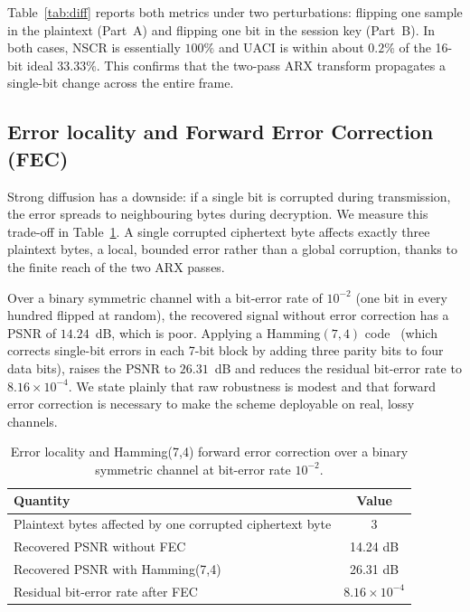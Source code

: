 \documentclass[pdflatex,sn-mathphys-num]{sn-jnl}%
\theoremstyle{thmstyleone}%
\theoremstyle{thmstyletwo}%
\theoremstyle{thmstylethree}%
\begin{document}
Table~\ref{tab:diff} reports both metrics under two perturbations: flipping one sample in the plaintext (Part~A) and flipping one bit in the session key (Part~B). In both cases, NSCR is essentially $100\%$ and UACI is within about $0.2\%$ of the 16-bit ideal $33.33\%$. This confirms that the two-pass ARX transform propagates a single-bit change across the entire frame.

\subsection{Error locality and Forward Error Correction (FEC)}
\label{sec:fec}

Strong diffusion has a downside: if a single bit is corrupted during transmission, the error spreads to neighbouring bytes during decryption. We measure this trade-off in Table~\ref{tab:fec}. A single corrupted ciphertext byte affects exactly three plaintext bytes, a local, bounded error rather than a global corruption, thanks to the finite reach of the two ARX passes.

Over a binary symmetric channel with a bit-error rate of $10^{-2}$ (one bit in every hundred flipped at random), the recovered signal without error correction has a PSNR of $14.24$~dB, which is poor. Applying a Hamming$(7,4)$ code~\cite{hamming1950} (which corrects single-bit errors in each 7-bit block by adding three parity bits to four data bits), raises the PSNR to $26.31$~dB and reduces the residual bit-error rate to $8.16\times10^{-4}$. We state plainly that raw robustness is modest and that forward error correction is necessary to make the scheme deployable on real, lossy channels.

\begin{table}[htbp]
\centering
\caption{Error locality and Hamming(7,4) forward error correction over a binary symmetric channel at bit-error rate $10^{-2}$.}
\label{tab:fec}
\small
\begin{tabular}{lc}
\toprule
\textbf{Quantity} & \textbf{Value} \\
\midrule
Plaintext bytes affected by one corrupted ciphertext byte & 3 \\
Recovered PSNR without FEC & 14.24 dB \\
Recovered PSNR with Hamming(7,4) & 26.31 dB \\
Residual bit-error rate after FEC & $8.16\times10^{-4}$ \\
\bottomrule
\end{tabular}
\end{table}
\end{document}
